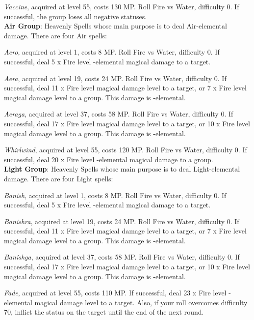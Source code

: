 \begin{multicols}{2}
    \textit{Vaccine}, acquired at level 55, costs 130 MP\@. Roll Fire vs Water, difficulty 0. If successful, the group loses all negative statuses.\\%

    \textbf{Air Group}: Heavenly Spells whose main purpose is to deal Air-elemental damage. There are four Air spells:

    \textit{Aero}, acquired at level 1, costs 8 MP\@. Roll Fire vs Water, difficulty 0. If successful, deal 5 x Fire level -elemental magical damage to a target.

    \textit{Aera}, acquired at level 19, costs 24 MP\@. Roll Fire vs Water, difficulty 0. If successful, deal 11 x Fire level magical damage level to a target, or 7 x Fire level magical damage level to a group. This damage is -elemental.

    \textit{Aeraga}, acquired at level 37, costs 58 MP\@. Roll Fire vs Water, difficulty 0. If successful, deal 17 x Fire level magical damage level to a target, or 10 x Fire level magical damage level to a group. This damage is -elemental.

    \textit{Whirlwind}, acquired at level 55, costs 120 MP\@. Roll Fire vs Water, difficulty 0. If successful, deal 20 x Fire level -elemental magical damage to a group.\\%

    \textbf{Light Group}: Heavenly Spells whose main purpose is to deal Light-elemental damage. There are four Light spells:

    \textit{Banish}, acquired at level 1, costs 8 MP\@. Roll Fire vs Water, difficulty 0. If successful, deal 5 x Fire level -elemental magical damage to a target.

    \textit{Banishra}, acquired at level 19, costs 24 MP\@. Roll Fire vs Water, difficulty 0. If successful, deal 11 x Fire level magical damage level to a target, or 7 x Fire level magical damage level to a group. This damage is -elemental.

    \textit{Banishga}, acquired at level 37, costs 58 MP\@. Roll Fire vs Water, difficulty 0. If successful, deal 17 x Fire level magical damage level to a target, or 10 x Fire level magical damage level to a group. This damage is -elemental.

    \textit{Fade}, acquired at level 55, costs 110 MP\@. If successful, deal 23 x Fire level -elemental magical damage level to a target. Also, if your roll overcomes difficulty 70, inflict the  status on the target until the end of the next round.


\end{multicols}
